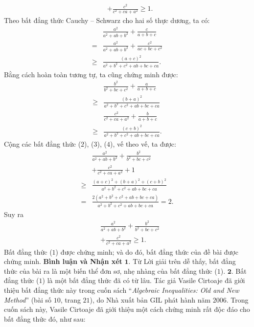 \begin{multicols}{2}
\begin{align*}
		&+ \frac{{{c^2}}}{{{c^2} + ca + {a^2}}} \ge 1. \tag{$1$}
	\end{align*}
	Theo bất đẳng thức Cauchy -- Schwarz cho hai số thực dương, ta có:
	\begin{align*}
		&\frac{{{a^2}}}{{{a^2} + ab + {b^2}}} + \frac{c}{{a + b + c}} \\
		= &\frac{{{a^2}}}{{{a^2} + ab + {b^2}}} + \frac{{{c^2}}}{{ac + bc + {c^2}}} \\
		\ge &\frac{{{{\left( {a + c} \right)}^2}}}{{{a^2} + {b^2} + {c^2} + ab + bc + ca}}. \tag{$2$}
	\end{align*}
	Bằng cách hoàn toàn tương tự, ta cũng chứng minh được:
	\begin{align*}
		&\frac{{{b^2}}}{{{b^2} + bc + {c^2}}} + \frac{a}{{a + b + c}} \\
		\ge &\frac{{{{\left( {b + a} \right)}^2}}}{{{a^2} + {b^2} + {c^2} + ab + bc + ca}} \tag{$3$}\\
		&\frac{{{c^2}}}{{{c^2} + ca + {a^2}}} + \frac{b}{{a + b + c}} \\
		\ge &\frac{{{{\left( {c + b} \right)}^2}}}{{{a^2} + {b^2} + {c^2} + ab + bc + ca}}. \tag{$4$}
	\end{align*}
	Cộng các bất đẳng thức ($2$), ($3$), ($4$), vế theo vế, ta được:
	\begin{align*}
			&\frac{{{a^2}}}{{{a^2}+ ab + {b^2}}} + \frac{{{b^2}}}{{{b^2} + bc + {c^2}}} \\
			&+ \frac{{{c^2}}}{{{c^2} + ca + {a^2}}} + 1\\[+1ex]
			\ge &\frac{{{{\left( {a + c} \right)}^2} + {{\left( {b + a} \right)}^2} + {{\left( {c + b} \right)}^2}}}{{{a^2} + {b^2} + {c^2} + ab + bc + ca}}\\[+1ex]
			= &\frac{{2\left( {{a^2} + {b^2} + {c^2} + ab + bc + ca} \right)}}{{{a^2} + {b^2} + {c^2} + ab + bc + ca}} = 2.
	\end{align*}
	Suy ra
	\begin{align*}
		&\frac{{{a^2}}}{{{a^2} + ab + {b^2}}} + \frac{{{b^2}}}{{{b^2} + bc + {c^2}}} \\
		&+ \frac{{{c^2}}}{{{c^2} + ca + {a^2}}} \ge 1.
	\end{align*}
	Bất đẳng thức ($1$) được chứng minh; và do đó, bất đẳng thức của đề bài được chứng minh.
	\vskip 0.05cm
	\textbf{\color{thachthuctoanhoc}Bình luận và Nhận xét}
	\vskip 0.05cm
	$\pmb{1.}$ Từ Lời giải trên dễ thấy, bất đẳng thức của bài ra là một biến thể đơn sơ, nhẹ nhàng của bất đẳng thức ($1$).
	\vskip 0.05cm
	$\pmb{2.}$ Bất đẳng thức ($1$) là một bất đẳng thức đã có từ lâu. Tác giả Vasile Cirtoaje đã giới thiệu bất đẳng thức này trong cuốn sách “\textit{Algebraic Inequalities: Old and New Method}” (bài số $10$, trang $21$), do Nhà xuất bản GIL phát hành năm $2006$. Trong cuốn sách này, Vasile Cirtoaje đã giới thiệu một cách chứng minh rất độc đáo cho bất đẳng thức đó,  như sau:

\end{multicols}
